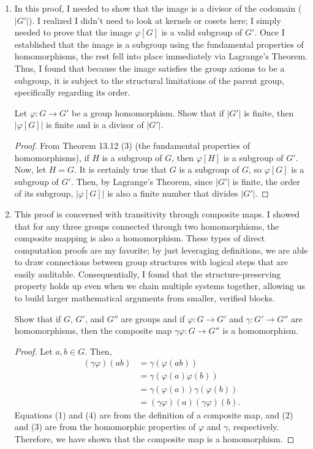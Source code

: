 \documentclass[12pt, oneside]{book}
\newcommand{\pf}[1]{
    \begin{customframedproof}[linecolor=horange!75]
        \begin{proof}
        #1
        \end{proof}
    \end{customframedproof}
}
\begin{document}
\begin{enumerate}[label=\textbf{\arabic*.}]
    \item In this proof,  I needed to show that the image is a divisor of the codomain (\(|G'|\)). I realized I didn't need to look at kernels or cosets here; I simply needed to prove that the image \(\varphi[G]\) is a valid subgroup of \(G'\). Once I established that the image is a subgroup using the fundamental properties of homomorphisms, the rest fell into place immediately via Lagrange's Theorem. Thus, I found that because the image satisfies the group axioms to be a subgroup, it is subject to the structural limitations of the parent group, specifically regarding its order.

    Let \(\varphi : G \to G'\) be a group homomorphism. Show that if \(|G'|\) is finite, then \(|\varphi[G]|\) is finite and is a divisor of \(|G'|\).
    \pf{
        From Theorem 13.12 (3) (the fundamental properties of homomorphisms), if \(H\) is a subgroup of \(G\), then \(\varphi[H]\) is a subgroup of \(G'\). Now, let \(H = G\). It is certainly true that \(G\) is a subgroup of \(G\), so \(\varphi[G]\) is a subgroup of \(G'\). Then, by Lagrange's Theorem, since \(|G'|\) is finite, the order of its subgroup, \(|\varphi[G]|\) is also a finite number that divides \(|G'|\).
    }
\newpage
    \item This proof is concerned with transitivity through composite maps. I showed that for any three groups connected through two homomorphisms, the composite mapping is also a homomorphism. These types of direct computation proofs are my favorite; by just leveraging definitions, we are able to draw connections between group structures with logical steps that are easily auditable. Consequentially, I found that the structure-preserving property holds up even when we chain multiple systems together, allowing us to build larger mathematical arguments from smaller, verified blocks.

    Show that if \(G\), \(G'\), and \(G''\) are groups and if \(\varphi : G \to G'\) and \(\gamma : G' \to G''\) are homomorphisms, then the composite map \(\gamma \varphi : G \to G''\) is a homomorphism.

    \pf{
        Let \(a, b \in G\). Then,
        \begin{align}
            (\gamma \varphi)(ab) &= \gamma(\varphi(ab)) \\
            &= \gamma(\varphi(a)\varphi(b)) \\
            &= \gamma(\varphi(a))\gamma(\varphi(b)) \\
            &= (\gamma \varphi)(a)(\gamma \varphi)(b).
        \end{align}
        Equations (1) and (4) are from the definition of a composite map, and (2) and (3) are from the homomorphic properties of \(\varphi\) and \(\gamma\), respectively. Therefore, we have shown that the composite map is a homomorphism.
    }
      

\end{enumerate}
\end{document}
